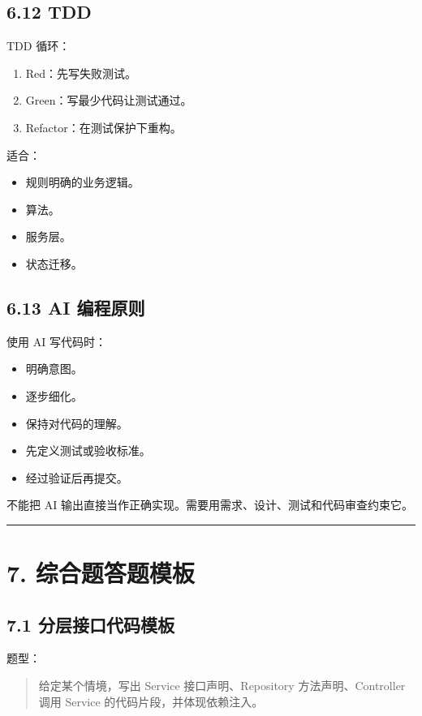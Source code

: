 \documentclass[UTF8,zihao=-4]{ctexart}
\begin{document}
\subsection{6.12 TDD}

TDD 循环：

\begin{enumerate}
\item Red：先写失败测试。
\item Green：写最少代码让测试通过。
\item Refactor：在测试保护下重构。
\end{enumerate}

适合：

\begin{itemize}
\item 规则明确的业务逻辑。
\item 算法。
\item 服务层。
\item 状态迁移。
\end{itemize}

\subsection{6.13 AI 编程原则}

使用 AI 写代码时：

\begin{itemize}
\item 明确意图。
\item 逐步细化。
\item 保持对代码的理解。
\item 先定义测试或验收标准。
\item 经过验证后再提交。
\end{itemize}

不能把 AI 输出直接当作正确实现。需要用需求、设计、测试和代码审查约束它。

\bigskip\hrule\bigskip

\section{7. 综合题答题模板}

\subsection{7.1 分层接口代码模板}

题型：

\begin{quote}
给定某个情境，写出 Service 接口声明、Repository 方法声明、Controller 调用 Service 的代码片段，并体现依赖注入。
\end{quote}
\end{document}
